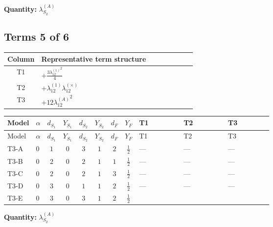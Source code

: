 \documentclass[8pt]{article}
\begin{document}
\begin{landscape}
\begin{longtable}{@{}llcccccc >{\raggedright\arraybackslash}p{0.21\linewidth} >{\raggedright\arraybackslash}p{0.21\linewidth} >{\raggedright\arraybackslash}p{0.21\linewidth}@{}}
\midrule
\bottomrule
\end{longtable}
\clearpage
\noindent\textbf{Quantity: }$\lambda_{S_2}^{(A)}$\par\smallskip
\subsection*{Terms 5 of 6}
\begin{center}
\begin{tabular}{@{}c >{\raggedright\arraybackslash}p{0.82\linewidth}@{}}
\toprule
Column & Representative term structure \\
\midrule
T1 & \(\displaystyle +\frac{3 {\lambda_{12}^{(1)}}^2}{4}\) \\
\midrule
T2 & \(\displaystyle +{\lambda_{12}^{(1)}} {\lambda_{12}^{(\times)}}\) \\
\midrule
T3 & \(\displaystyle +12 {\lambda_{12}^{(A)}}^2\) \\
\midrule
\bottomrule
\end{tabular}
\end{center}
\smallskip
\tiny
\begin{longtable}{@{}llcccccc >{\raggedright\arraybackslash}p{0.21\linewidth} >{\raggedright\arraybackslash}p{0.21\linewidth} >{\raggedright\arraybackslash}p{0.21\linewidth}@{}}
\toprule
Model & $\alpha$ & $d_{S_1}$ & $Y_{S_1}$ & $d_{S_2}$ & $Y_{S_2}$ & $d_F$ & $Y_F$ & T1 & T2 & T3 \\
\midrule
\endfirsthead
\toprule
Model & $\alpha$ & $d_{S_1}$ & $Y_{S_1}$ & $d_{S_2}$ & $Y_{S_2}$ & $d_F$ & $Y_F$ & T1 & T2 & T3 \\
\midrule
\endhead
T3-A & $0$ & $1$ & $0$ & $3$ & $1$ & $2$ & $\frac{1}{2}$ & --- & --- & --- \\
\midrule
T3-B & $0$ & $2$ & $0$ & $2$ & $1$ & $1$ & $\frac{1}{2}$ & --- & --- & --- \\
\midrule
T3-C & $0$ & $2$ & $0$ & $2$ & $1$ & $3$ & $\frac{1}{2}$ & --- & --- & --- \\
\midrule
T3-D & $0$ & $3$ & $0$ & $1$ & $1$ & $2$ & $\frac{1}{2}$ & --- & --- & --- \\
\midrule
T3-E & $0$ & $3$ & $0$ & $3$ & $1$ & $2$ & $\frac{1}{2}$ & \scriptsize\adjustbox{max width=\linewidth}{$\begin{gathered} +\frac{3 {\lambda_{12}^{(1)}}^2}{4}\end{gathered}$} & \scriptsize\adjustbox{max width=\linewidth}{$\begin{gathered} +{\lambda_{12}^{(1)}} {\lambda_{12}^{(\times)}}\end{gathered}$} & \scriptsize\adjustbox{max width=\linewidth}{$\begin{gathered} +12 {\lambda_{12}^{(A)}}^2\end{gathered}$} \\
\midrule
\bottomrule
\end{longtable}
\clearpage
\noindent\textbf{Quantity: }$\lambda_{S_2}^{(A)}$\par\smallskip

\end{landscape}
\end{document}
